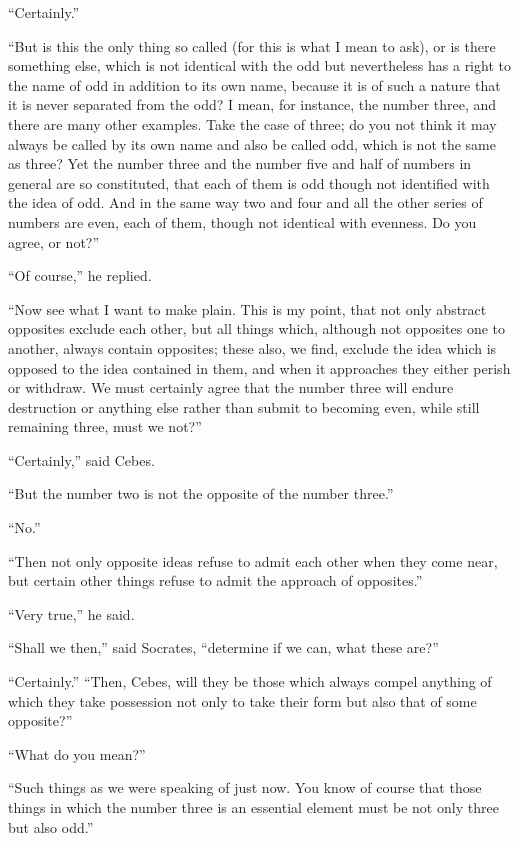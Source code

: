 \documentclass[letterpaper,12pt]{article}
\newcommand{\stephpag}[1]{\marginnote{\small\itshape\fontfamily{ppl}\selectfont #1}}
\begin{document}
\begin{drama}
``Certainly.''
 
``But is this the only thing so called (for this is what I mean to ask), or is there something else, which is not \stephpag{104 a} identical with the odd but nevertheless has a right to the name of odd in addition to its own name, because it is of such a nature that it is never separated from the odd? I mean, for instance, the number three, and there are many other examples. Take the case of three; do you not think it may always be called by its own name and also be called odd, which is not the same as three? Yet the number three and the number five and half of numbers in general are so constituted, that each of them is odd \stephpag{b} though not identified with the idea of odd. And in the same way two and four and all the other series of numbers are even, each of them, though not identical with evenness. Do you agree, or not?''
 
``Of course,'' he replied.
 
``Now see what I want to make plain. This is my point, that not only abstract opposites exclude each other, but all things which, although not opposites one to another, always contain opposites; these also, we find, exclude the idea which is opposed to the idea contained in them, \stephpag{c} and when it approaches they either perish or withdraw. We must certainly agree that the number three will endure destruction or anything else rather than submit to becoming even, while still remaining three, must we not?''
 
``Certainly,'' said Cebes.
 
``But the number two is not the opposite of the number three.''
 
``No.''
 
``Then not only opposite ideas refuse to admit each other when they come near, but certain other things refuse to admit the approach of opposites.''
 
``Very true,'' he said.
 
``Shall we then,'' said Socrates, ``determine if we can, what these are?''
 
``Certainly.'' \stephpag{d} ``Then, Cebes, will they be those which always compel anything of which they take possession not only to take their form but also that of some opposite?''
 
``What do you mean?''
 
``Such things as we were speaking of just now. You know of course that those things in which the number three is an essential element must be not only three but also odd.''
 

\end{drama}
\end{document}
